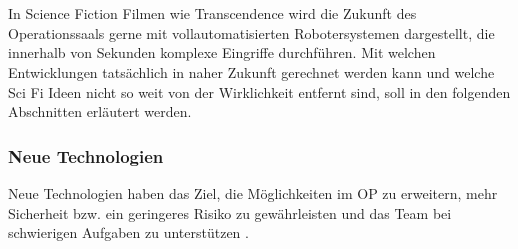 \chapter{}
\label{sec:overview}

In Science Fiction Filmen wie Transcendence wird die Zukunft des Operationssaals gerne mit vollautomatisierten Robotersystemen dargestellt, die innerhalb von Sekunden komplexe Eingriffe durchführen. 
Mit welchen Entwicklungen tatsächlich in naher Zukunft gerechnet werden kann und welche Sci Fi Ideen nicht so weit von der Wirklichkeit entfernt sind, soll in den folgenden Abschnitten erläutert werden.

\subsection{Neue Technologien}
Neue Technologien haben das Ziel, die Möglichkeiten im OP zu erweitern, mehr Sicherheit bzw. ein geringeres Risiko zu gewährleisten und das Team bei schwierigen Aufgaben zu unterstützen \cite{CurrentAndFuture}. 

